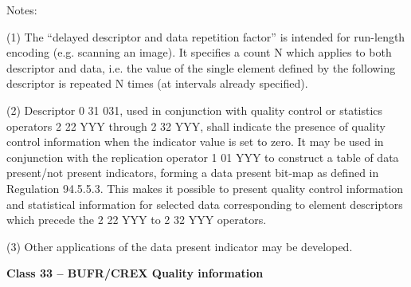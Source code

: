 Notes:

(1) The ``delayed descriptor and data repetition factor'' is intended for run-length encoding (e.g. scanning an image). It specifies a count N which applies to both descriptor and data, i.e. the value of the single element defined by the following descriptor is repeated N times (at intervals already specified).

(2) Descriptor 0 31 031, used in conjunction with quality control or statistics operators 2 22 YYY through 2 32 YYY, shall indicate the presence of quality control information when the indicator value is set to zero. It may be used in conjunction with the replication operator 1 01 YYY to construct a table of data present/not present indicators, forming a data present bit-map as defined in Regulation 94.5.5.3. This makes it possible to present quality control information and statistical information for selected data corresponding to element descriptors which precede the 2 22 YYY to 2 32 YYY operators.

(3) Other applications of the data present indicator may be developed.

\textbf{Class 33 -- BUFR/CREX Quality information}

